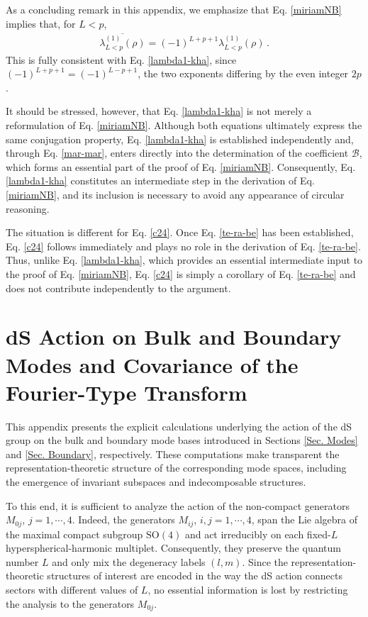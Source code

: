 \documentclass[aps,twocolumn,nofootinbib]{revtex4}
\begin{document}
{\begin{appendix}
As a concluding remark in this appendix, we emphasize that Eq. \eqref{miriamNB} implies that, for $L<p$,
\begin{align}
    \overline{\lambda_{L<p}^{(1)}(\rho)} = (-1)^{L+p+1}\lambda_{L<p}^{(1)}(\rho) \,.
\end{align}
This is fully consistent with Eq. \eqref{lambda1-kha}, since $(-1)^{L+p+1}=(-1)^{L-p+1}$, the two exponents differing by the even integer $2p$. 

It should be stressed, however, that Eq. \eqref{lambda1-kha} is not merely a reformulation of Eq. \eqref{miriamNB}. Although both equations ultimately express the same conjugation property, Eq. \eqref{lambda1-kha} is established independently and, through Eq. \eqref{mar-mar}, enters directly into the determination of the coefficient $\mathcal{B}$, which forms an essential part of the proof of Eq. \eqref{miriamNB}. Consequently, Eq. \eqref{lambda1-kha} constitutes an intermediate step in the derivation of Eq. \eqref{miriamNB}, and its inclusion is necessary to avoid any appearance of circular reasoning.

The situation is different for Eq. \eqref{c24}. Once Eq. \eqref{te-ra-be} has been established, Eq. \eqref{c24} follows immediately and plays no role in the derivation of Eq. \eqref{te-ra-be}. Thus, unlike Eq. \eqref{lambda1-kha}, which provides an essential intermediate input to the proof of Eq. \eqref{miriamNB}, Eq. \eqref{c24} is simply a corollary of Eq. \eqref{te-ra-be} and does not contribute independently to the argument.


\section{dS Action on Bulk and Boundary Modes and Covariance of the Fourier-Type Transform}\label{App. Action}

This appendix presents the explicit calculations underlying the action of the dS group on the bulk and boundary mode bases introduced in Sections \ref{Sec. Modes} and \ref{Sec. Boundary}, respectively. These computations make transparent the representation-theoretic structure of the corresponding mode spaces, including the emergence of invariant subspaces and indecomposable structures.

To this end, it is sufficient to analyze the action of the non-compact generators $M_{0j}$, $j=1,\cdots,4$. Indeed, the generators $M_{ij}$, $i,j=1,\cdots,4$, span the Lie algebra of the maximal compact subgroup $\mathrm{SO}(4)$ and act irreducibly on each fixed-$L$ hyperspherical-harmonic multiplet. Consequently, they preserve the quantum number $L$ and only mix the degeneracy labels $(l,m)$. Since the representation-theoretic structures of interest are encoded in the way the dS action connects sectors with different values of $L$, no essential information is lost by restricting the analysis to the generators $M_{0j}$.


\end{appendix}}
\end{document}
